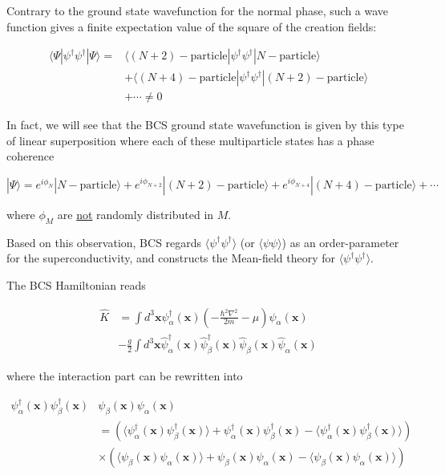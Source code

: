 Contrary to the ground state wavefunction for the normal phase, such a wave function gives a finite expectation value of the square of the creation fields: 

\[\begin{split}
\langle \Psi|\psi^{\dagger}\psi^{\dagger}|\Psi\rangle =& \langle (N+2)-\text{particle}|\psi^{\dagger}\psi^{\dagger}|N-\text{particle}\rangle \\ &+ \langle(N+4)-\text{particle}|\psi^{\dagger}\psi^{\dagger}|(N+2)-\text{particle}\rangle\\ & + \cdots \neq 0 \end{split}\]

In fact, we will see that the BCS ground state wavefunction is given by this type of linear superposition where each of these multiparticle states has a phase coherence

\[|\Psi\rangle = e^{i\phi_N}|N-\text{particle}\rangle + e^{i\phi_{N+2}}|(N+2)-\text{particle}\rangle + e^{i\phi_{N+4}}|(N+4)-\text{particle}\rangle + \cdots  \]

where $\phi_M$ are \uline{not} randomly distributed in $M$. 

Based on this observation, BCS regards $\langle\psi^{\dagger}\psi^{\dagger}\rangle$ (or $\langle \psi\psi\rangle$) as an order-parameter for the superconductivity, and constructs the Mean-field theory for $\langle \psi^{\dagger}\psi^{\dagger}\rangle$. 

The BCS Hamiltonian reads 

\[\begin{split}\hat{K}& = \int d^3 \bm{x}\psi^{\dagger}_{\alpha}(\bm{x})\left(-\frac{\hbar^2\nabla^2}{2m} - \mu\right)\psi_{\alpha}(\bm{x})\\
&-\frac{g}{2} \int d^3\bm{x} \hat{\psi}_{\alpha}^{\dagger}(\bm{x}) \hat{\psi}_{\beta}^{\dagger}(\bm{x}) \hat{\psi}_{\beta}(\bm{x})\hat{\psi}_{\alpha}(\bm{x}) \end{split}\]

where the interaction part can be rewritten into 

\[\begin{split}\psi_{\alpha}^{\dagger}(\bm{x})\psi_{\beta}^{\dagger}(\bm{x})&\psi_{\beta}(\bm{x})\psi_{\alpha}(\bm{x})\\
 &=  \left(\langle\psi^{\dagger}_{\alpha}(\bm{x})\psi^{\dagger}_{\beta}(\bm{x})\rangle + \psi^{\dagger}_{\alpha}(\bm{x})\psi^{\dagger}_{\beta}(\bm{x}) - \langle\psi^{\dagger}_{\alpha}(\bm{x})\psi^{\dagger}_{\beta}(\bm{x})\rangle\right)\\
&\times \left(\langle\psi_{\beta}(\bm{x})\psi_{\alpha}(\bm{x})\rangle + \psi_{\beta}(\bm{x})\psi_{\alpha}(\bm{x}) - \langle\psi_{\beta}(\bm{x})\psi_{\alpha}(\bm{x})\rangle\right)
\end{split}\]

